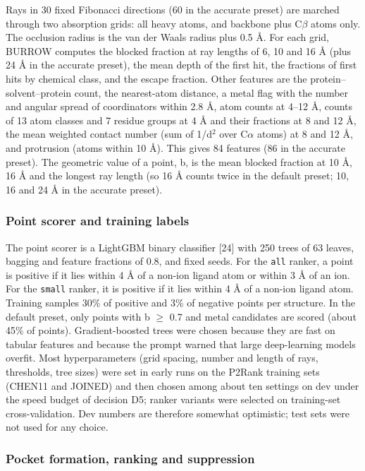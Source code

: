 \documentclass[10pt,letterpaper]{article}
\begin{document}
Rays in 30 fixed Fibonacci directions (60 in the accurate preset) are marched through two absorption grids: all heavy atoms, and backbone plus C$\beta$ atoms only. The occlusion radius is the van der Waals radius plus 0.5 \AA{}. For each grid, BURROW computes the blocked fraction at ray lengths of 6, 10 and 16 \AA{} (plus 24 \AA{} in the accurate preset), the mean depth of the first hit, the fractions of first hits by chemical class, and the escape fraction. Other features are the protein--solvent--protein count, the nearest-atom distance, a metal flag with the number and angular spread of coordinators within 2.8 \AA{}, atom counts at 4--12 \AA{}, counts of 13 atom classes and 7 residue groups at 4 \AA{} and their fractions at 8 and 12 \AA{}, the mean weighted contact number (sum of 1/d$^{2}$ over C$\alpha$ atoms) at 8 and 12 \AA{}, and protrusion (atoms within 10 \AA{}). This gives 84 features (86 in the accurate preset). The geometric value of a point, b, is the mean blocked fraction at 10 \AA{}, 16 \AA{} and the longest ray length (so 16 \AA{} counts twice in the default preset; 10, 16 and 24 \AA{} in the accurate preset).

\subsubsection*{Point scorer and training labels}

The point scorer is a LightGBM binary classifier [24] with 250 trees of 63 leaves, bagging and feature fractions of 0.8, and fixed seeds. For the \texttt{all} ranker, a point is positive if it lies within 4 \AA{} of a non-ion ligand atom or within 3 \AA{} of an ion. For the \texttt{small} ranker, it is positive if it lies within 4 \AA{} of a non-ion ligand atom. Training samples 30\% of positive and 3\% of negative points per structure. In the default preset, only points with b $\ge$ 0.7 and metal candidates are scored (about 45\% of points). Gradient-boosted trees were chosen because they are fast on tabular features and because the prompt warned that large deep-learning models overfit. Most hyperparameters (grid spacing, number and length of rays, thresholds, tree sizes) were set in early runs on the P2Rank training sets (CHEN11 and JOINED) and then chosen among about ten settings on dev under the speed budget of decision D5; ranker variants were selected on training-set cross-validation. Dev numbers are therefore somewhat optimistic; test sets were not used for any choice.

\subsubsection*{Pocket formation, ranking and suppression}
\end{document}
